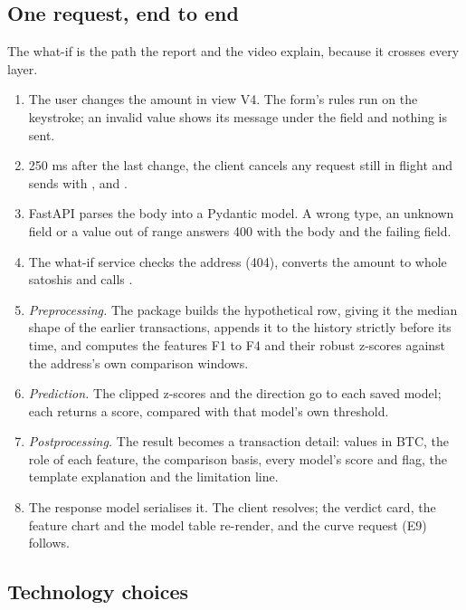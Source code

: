 \subsection{One request, end to end}
\label{sec:walkthrough}

The what-if is the path the report and the video explain, because it crosses every layer.

\begin{enumerate}
  \item The user changes the amount in view V4. The form's rules run on the keystroke; an invalid
    value shows its message under the field and nothing is sent.
  \item 250 ms after the last change, the client cancels any request still in flight and sends
     with ,  and
    .
  \item FastAPI parses the body into a Pydantic model. A wrong type, an unknown field or a value
    out of range answers 400 with the  body and the failing field.
  \item The what-if service checks the address (404), converts the amount to whole satoshis and
    calls .
  \item \emph{Preprocessing.} The package builds the hypothetical row, giving it the median shape of
    the earlier transactions, appends it to the history strictly before its time, and computes the
    features F1 to F4 and their robust z-scores against the address's own comparison windows.
  \item \emph{Prediction.} The clipped z-scores and the direction go to each saved model; each
    returns a score, compared with that model's own threshold.
  \item \emph{Postprocessing.} The result becomes a transaction detail: values in BTC, the role of
    each feature, the comparison basis, every model's score and flag, the template explanation and
    the limitation line.
  \item The response model serialises it. The client resolves; the verdict card, the feature chart
    and the model table re-render, and the curve request (E9) follows.
\end{enumerate}

\subsection{Technology choices}
\label{sec:stack}

